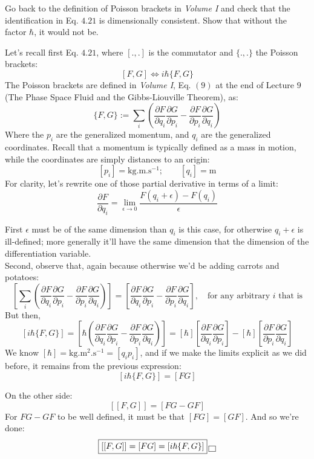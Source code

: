 \documentclass[solutions.tex]{subfiles}
\begin{document}
\maketitle
\begin{exercise} Go back to the definition of Poisson brackets
in \textit{Volume I} and check that the identification in Eq. $4.21$
is dimensionally consistent. Show that without the factor $\hbar$, it
would not be.
\end{exercise}
Let's recall first Eq. $4.21$, where $[.,.]$ is the commutator
and $\{.,.\}$ the Poisson brackets:
\[
	[F, G] \Longleftrightarrow i\hbar\{F,G\}
\]
The Poisson brackets are defined in \textit{Volume I},
Eq. $(9)$ at the end of Lecture $9$ (The Phase Space
Fluid and the Gibbs-Liouville Theorem), as:
\[
	\{F,G\} := \sum_i\left(
		\frac{\partial F}{\partial q_i}
		\frac{\partial G}{\partial p_i}
		-
		\frac{\partial F}{\partial p_i}
		\frac{\partial G}{\partial q_i}
	\right)
\]
Where the $p_i$ are the generalized momentum, and $q_i$ are
the generalized coordinates. Recall that a momentum is typically
defined as a mass in motion, while the coordinates are simply distances
to an origin:
\[
	[p_i] = \text{kg}.\text{m}.\text{s}^{-1};\qquad
	[q_i] = \text{m}
\]
For clarity, let's rewrite one of those partial derivative
in terms of a limit:
\[
	\frac{\partial F}{\partial q_i} = \lim_{\epsilon\rightarrow 0}
	\frac{F(q_i+\epsilon)-F(q_i)}{\epsilon}
\]

First $\epsilon$ must be of the same dimension than $q_i$ is this
case, for otherwise $q_i+\epsilon$ is ill-defined; more generally
it'll have the same dimension that the dimension of the differentiation
variable. \\

Second, observe that, again because otherwise we'd be adding
carrots and potatoes:
\[
	\left[
		\sum_i\left(
				\frac{\partial F}{\partial q_i}
				\frac{\partial G}{\partial p_i}
				-
				\frac{\partial F}{\partial p_i}
				\frac{\partial G}{\partial q_i}
			\right)
	\right] = \left[
		\frac{\partial F}{\partial q_i}
		\frac{\partial G}{\partial p_i}
			-
		\frac{\partial F}{\partial p_i}
		\frac{\partial G}{\partial q_i}
	\right],\quad\text{for any arbitrary $i$ that is}
\]
But then,
\[
	[i\hbar\{F,G\}] = \left[\hbar\left(
		\frac{\partial F}{\partial q_i}
		\frac{\partial G}{\partial p_i}
			-
		\frac{\partial F}{\partial p_i}
		\frac{\partial G}{\partial q_i}
	\right)\right] = [\hbar]\left[
		\frac{\partial F}{\partial q_i}
		\frac{\partial G}{\partial p_i}
	\right] - [\hbar]\left[
		\frac{\partial F}{\partial p_i}
		\frac{\partial G}{\partial q_i}
	\right]
\]
We know $[\hbar] = \text{kg}.\text{m}^2.\text{s}^{-1} = [q_i p_i]$,
and if we make the limits explicit as we did before, it remains
from the previous expression:
\[
	[i\hbar\{F,G\}] = [FG]
\]

On the other side:
\[
	[[F, G]] = [FG - GF]
\]
For $FG-GF$ to be well defined, it must be that $[FG] = [GF]$. And
so we're done:
\[
	\boxed{[[F, G]] = [FG] = [i\hbar\{F,G\}]} \qed
\]
\end{document}
